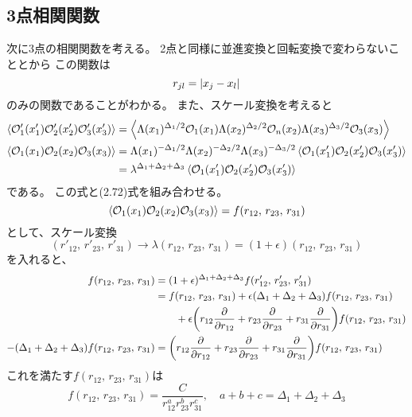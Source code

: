 \documentclass[../../master.tex]{subfiles}
\begin{document}
\subsection*{3点相関関数}
次に3点の相関関数を考える。
2点と同様に並進変換と回転変換で変わらないこととから
この関数は
\begin{equation}
    r_{jl} = \abs{x_j-x_l}
\end{equation}
のみの関数であることがわかる。
また、スケール変換を考えると
\begin{align}
    \ev{\mathcal{O}'_1(x'_1)\mathcal{O}'_2(x'_2)\mathcal{O}'_3(x'_3)}
    &= \ev{\Lambda(x_1)^{\Delta_1/2}\mathcal{O}_1(x_1)\Lambda(x_2)^{\Delta_2/2}\mathcal{O}_n(x_2)\Lambda(x_3)^{\Delta_3/2}\mathcal{O}_3(x_3)} \notag\\
    \ev{\mathcal{O}_1(x_1)\mathcal{O}_2(x_2)\mathcal{O}_3(x_3)}
    &= \Lambda(x_1)^{-\Delta_1/2}\Lambda(x_2)^{-\Delta_2/2}\Lambda(x_3)^{-\Delta_3/2}\ev{\mathcal{O}_1(x'_1)\mathcal{O}_2(x'_2)\mathcal{O}_3(x'_3)}\notag\\
    &= \lambda^{\Delta_1+\Delta_2+\Delta_3}\ev{\mathcal{O}_1(x'_1)\mathcal{O}_2(x'_2)\mathcal{O}_3(x'_3)}\notag
\end{align}
である。
この式と(2.72)式を組み合わせる。
\begin{equation*}
    \ev{\mathcal{O}_1(x_1)\mathcal{O}_2(x_2)\mathcal{O}_3(x_3)} = f(r_{12},\,r_{23},\,r_{31})
\end{equation*}
として、スケール変換
\begin{equation*}
    (r'_{12},\,r'_{23},\,r'_{31})\rightarrow\lambda(r_{12},\,r_{23},\,r_{31}) = (1+\epsilon)(r_{12},\,r_{23},\,r_{31})
\end{equation*}
を入れると、
\begin{align*}
    f(r_{12},\,r_{23},\,r_{31})
        &= (1+\epsilon)^{\Delta_1+\Delta_2+\Delta_3}f(r'_{12},\,r'_{23},\,r'_{31})\\
        &= f(r_{12},\,r_{23},\,r_{31}) + \epsilon(\Delta_1+\Delta_2+\Delta_3)f(r_{12},\,r_{23},\,r_{31})\\
            &\qquad + \epsilon \qty(r_{12}\pdv{r_{12}}+r_{23}\pdv{r_{23}}+r_{31}\pdv{r_{31}})f(r_{12},\,r_{23},\,r_{31})\\
    -(\Delta_1+\Delta_2+\Delta_3)f(r_{12},\,r_{23},\,r_{31})
        &=\qty(r_{12}\pdv{r_{12}}+r_{23}\pdv{r_{23}}+r_{31}\pdv{r_{31}})f(r_{12},\,r_{23},\,r_{31})
\end{align*}
これを満たす\(f(r_{12},\,r_{23},\,r_{31})\)は
\begin{equation*}
    f(r_{12},\,r_{23},\,r_{31}) = \frac{C}{r_{12}^a r_{23}^b r_{31}^c},\quad a+b+c =\Delta_1+\Delta_2+\Delta_3
\end{equation*}
\end{document}
